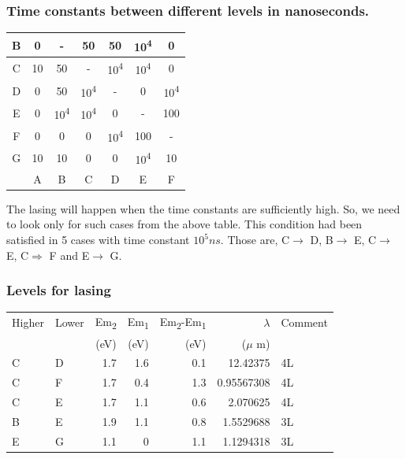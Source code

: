\documentclass[a4paper,11pt]{article}
\begin{document}
\subsubsection*{Time constants between different levels in nanoseconds.}
\label{sec:orga27d2ff}
\begin{center}
\begin{tabular}{|c|c|c|c|c|c|c|}
\hline
B & 0 & - & 50 & 50 & 10\textsuperscript{4} & 0\\
\hline
C & 10 & 50 & - & 10\textsuperscript{4} & 10\textsuperscript{4} & 0\\
\hline
D & 0 & 50 & 10\textsuperscript{4} & - & 0 & 10\textsuperscript{4}\\
\hline
E & 0 & 10\textsuperscript{4} & 10\textsuperscript{4} & 0 & - & 100\\
\hline
F & 0 & 0 & 0 & 10\textsuperscript{4} & 100 & -\\
\hline
G & 10 & 10 & 0 & 0 & 10\textsuperscript{4} & 10\\
\hline
 & A & B & C & D & E & F\\
\hline
\end{tabular}
\end{center}

The lasing will happen when the time constants are sufficiently high. So, we need to look only for such cases from the above table. This condition had been satisfied in 5 cases with time constant \(10^{5} ns\). Those are,  C\(\rightarrow\) D, B\(\rightarrow\) E, C\(\rightarrow\) E, C\(\Rightarrow\) F and E\(\rightarrow\) G.

\subsubsection*{Levels for lasing}
\label{sec:org2525d2b}

\begin{center}
\begin{tabular}{llrrrrl}
\hline
Higher & Lower & Em\textsubscript{2} & Em\textsubscript{1} & Em\textsubscript{2}-Em\textsubscript{1} & \(\lambda\) & Comment\\
 &  & (eV) & (eV) & (eV) & (\(\mu\) m) & \\
\hline
C & D & 1.7 & 1.6 & 0.1 & 12.42375 & 4L\\
C & F & 1.7 & 0.4 & 1.3 & 0.95567308 & 4L\\
C & E & 1.7 & 1.1 & 0.6 & 2.070625 & 4L\\
B & E & 1.9 & 1.1 & 0.8 & 1.5529688 & 3L\\
E & G & 1.1 & 0 & 1.1 & 1.1294318 & 3L\\
\hline
\end{tabular}
\end{center}
\end{document}
